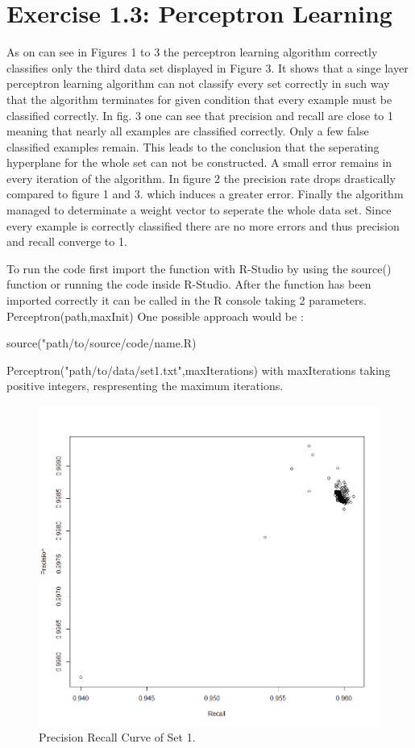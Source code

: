 \documentclass{scrartcl}
\begin{document}
\section{Exercise 1.3: Perceptron Learning}

As on can see in Figures 1 to 3 the perceptron learning algorithm correctly classifies only the third data set displayed in Figure 3. 
It shows that a singe layer perceptron learning algorithm can not classify every set correctly in such way that the algorithm terminates for given condition that every example must be classified correctly.
In fig. 3 one can see that precision and recall are close to 1 meaning that nearly all examples are classified correctly. Only a few false classified examples remain. This leads to the conclusion that the seperating hyperplane for the whole set can not be constructed.
A small error remains in every iteration of the algorithm. In figure 2 the precision rate drops drastically compared to figure 1 and 3. which induces a greater error. Finally the algorithm managed to determinate a weight vector to seperate the whole data set.
Since every example is correctly classified there are no more errors and thus precision and recall converge to 1.

To run the code first import the function with R-Studio by using the source() function or running the code inside R-Studio. 
After the function has been imported correctly it can be called in the R console taking 2 parameters. Perceptron(path,maxInit)
One possible approach would be : 
\item source("path/to/source/code/name.R)
\item Perceptron("path/to/data/set1.txt",maxIterations) with maxIterations taking positive integers, respresenting the maximum iterations.

\begin{figure}[ht]
\begin{center}
\includegraphics[scale=0.3]{PerceptronSet1.png}
\end{center}
\caption{Precision Recall Curve of Set 1.}
\label{Img:PrecisionRecallS1}
\end{figure}
\end{document}

